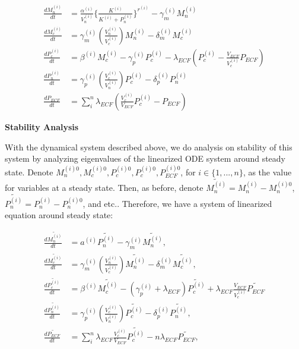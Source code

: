 \documentclass[12pt]{article}
\renewcommand{\(}{\left (}
\renewcommand{\)}{\right )}
\begin{document}
\begin{align}
    \frac{dM_n^{(i)}}{dt} &= \frac{\alpha^{(i)}}{V_n^{(i)}} \{\frac{K^{(i)}}{K^{(i)} + P_n^{(i)}}\}^{r^{(i)}} - \gamma_m^{(i)} M_n^{(i)} \\
    \frac{dM_c^{(i)}}{dt} &= \gamma_m^{(i)} (\frac{V_n^{(i)}}{V_c^{(i)}}) M_n^{(i)} - \delta_m^{(i)} M_c^{(i)} \\
    \frac{dP_c^{(i)}}{dt} &= \beta^{(i)} M_c^{(i)} - \gamma_p^{(i)} P_c^{(i)} - \lambda_{ECF} (P_c^{(i)} - \frac{V_{ECF}}{V_c^{(i)}} P_{ECF})\\
    \frac{dP_n^{(i)}}{dt} &= \gamma_p^{(i)} (\frac{V_c^{(i)}}{V_n^{(i)}}) P_c^{(i)} - \delta_p^{(i)} P_n^{(i)} \\
    \frac{dP_{ECF}}{dt} &= \sum_i^n \lambda_{ECF} (\frac{V_c^{(i)}}{V_{ECF}} P_c^{(i)} - P_{ECF})
\end{align}

\textbf{Stability Analysis \\}

With the dynamical system described above, we do analysis on stability of this system by analyzing eigenvalues of the linearized ODE system around steady state. Denote $M_n^{(i)0}, M_c^{(i)0}, P_c^{(i)0}, P_c^{(i)0}, P_{ECF}^{(i)0}$, for $i \in \{1, ..., n\}$, as the value for variables at a steady state. Then, as before, denote $\widetilde{M_n^{(i)}} = M_n^{(i)} - M_n^{(i)0}$, $\widetilde{P_n^{(i)}} = P_n^{(i)} - P_n^{(i)0}$, and etc.. Therefore, we have a system of linearized equation around steady state:

\begin{align}
    \frac{d\widetilde{M_n^{(i)}}}{dt} &= a^{(i)} \widetilde{P_n^{(i)}} - \gamma_m^{(i)} \widetilde{M_n^{(i)}}, \\
    \frac{d\widetilde{M_c^{(i)}}}{dt} &= \gamma_m^{(i)} (\frac{V_n^{(i)}}{V_c^{(i)}}) \widetilde{M_n^{(i)}} - \delta_m^{(i)} \widetilde{M_c^{(i)}}, \\
    \frac{d\widetilde{P_c^{(i)}}}{dt} &= \beta^{(i)} \widetilde{M_c^{(i)}} - (\gamma_p^{(i)} + \lambda_{ECF}) \widetilde{P_c^{(i)}} + \lambda_{ECF} \frac{V_{ECF}}{V_c^{(i)}} \widetilde{P_{ECF}}\\
    \frac{d\widetilde{P_n^{(i)}}}{dt} &= \gamma_p^{(i)} (\frac{V_c^{(i)}}{V_n^{(i)}}) \widetilde{P_c^{(i)}} - \delta_p^{(i)} \widetilde{P_n^{(i)}}, \\
    \frac{d\widetilde{P_{ECF}}}{dt} &= \sum_i^n \lambda_{ECF} \frac{V_c^{(i)}}{V_{ECF}} \widetilde{P_c^{(i)}} - n \lambda_{ECF} \widetilde{P_{ECF}},
\end{align}
\end{document}
